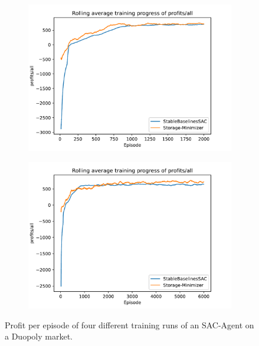 \begin{figure}[!hbt]
	\begin{subfigure}{0.49\textwidth}
		\centering
		\includegraphics[width = \textwidth]{images/experiments/SACDuopoly/SACDuopolyProfitsMean3.pdf}\\[1 ex]
		\label{fig:SACDuopolyProfitsMean3}
	\end{subfigure}
	\begin{subfigure}{0.49\textwidth}
		\centering
		\includegraphics[width = \textwidth]{images/experiments/SACDuopoly/SACDuopolyProfitsMean4.pdf}\\[1 ex]
		\label{fig:SACDuopolyProfitsMean4}
	\end{subfigure}
	\caption{Profit per episode of four different training runs of an SAC-Agent on a Duopoly market.}\label{fig:SACDuopolyProfitsMean}
\end{figure}


